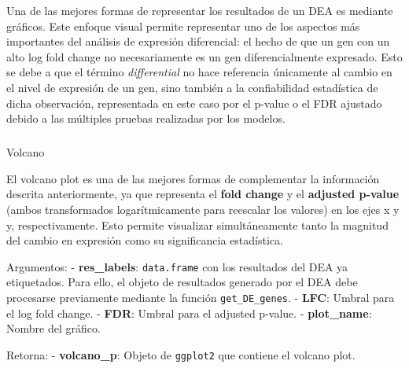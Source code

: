\documentclass[
  10pt,
]{article}
\makeatletter
\let\oldsubparagraph\subparagraph
\renewcommand{\subparagraph}{
    \@ifstar
      \xxxSubParagraphStar
      \xxxSubParagraphNoStar
  }
\newcommand{\xxxSubParagraphStar}[1]{\oldsubparagraph*{#1}\mbox{}}
\newcommand{\xxxSubParagraphNoStar}[1]{\oldsubparagraph{#1}\mbox{}}
\makeatother
\begin{document}
Una de las mejores formas de representar los resultados de un DEA es
mediante gráficos. Este enfoque visual permite representar uno de los
aspectos más importantes del análisis de expresión diferencial: el hecho
de que un gen con un alto log fold change no necesariamente es un gen
diferencialmente expresado. Esto se debe a que el término
\emph{differential} no hace referencia únicamente al cambio en el nivel
de expresión de un gen, sino también a la confiabilidad estadística de
dicha observación, representada en este caso por el p-value o el FDR
ajustado debido a las múltiples pruebas realizadas por los modelos.

\subparagraph{Volcano}\label{volcano}

El volcano plot es una de las mejores formas de complementar la
información descrita anteriormente, ya que representa el \textbf{fold
change} y el \textbf{adjusted p-value} (ambos transformados
logarítmicamente para reescalar los valores) en los ejes x y y,
respectivamente. Esto permite visualizar simultáneamente tanto la
magnitud del cambio en expresión como su significancia estadística.

Argumentos: - \textbf{res\_labels}: \texttt{data.frame} con los
resultados del DEA ya etiquetados. Para ello, el objeto de resultados
generado por el DEA debe procesarse previamente mediante la función
\texttt{get\_DE\_genes}. - \textbf{LFC}: Umbral para el log fold change.
- \textbf{FDR}: Umbral para el adjusted p-value. - \textbf{plot\_name}:
Nombre del gráfico.

Retorna: - \textbf{volcano\_p}: Objeto de \texttt{ggplot2} que contiene
el volcano plot.
\end{document}

